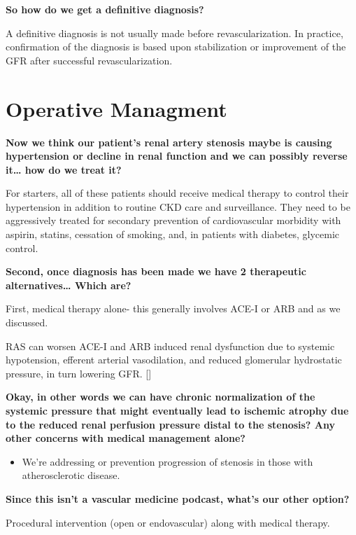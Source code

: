 \documentclass[
]{book}
\providecommand{\tightlist}{%
  \setlength{\itemsep}{0pt}\setlength{\parskip}{0pt}}
\begin{document}
\textbf{So how do we get a definitive diagnosis?}

A definitive diagnosis is not usually made before revascularization. In
practice, confirmation of the diagnosis is based upon stabilization or
improvement of the GFR after successful revascularization.

\hypertarget{operative-managment}{%
\section{Operative Managment}\label{operative-managment}}

\textbf{Now we think our patient's renal artery stenosis maybe is causing
hypertension or decline in renal function and we can possibly reverse
it\ldots{} how do we treat it?}

For starters, all of these patients should receive medical therapy to
control their hypertension in addition to routine CKD care and
surveillance. They need to be aggressively treated for secondary
prevention of cardiovascular morbidity with aspirin, statins, cessation
of smoking, and, in patients with diabetes, glycemic control.

\textbf{Second, once diagnosis has been made we have 2 therapeutic
alternatives\ldots{} Which are?}

First, medical therapy alone- this generally involves ACE-I or ARB and
as we discussed.

RAS can worsen ACE-I and ARB induced renal dysfunction due to systemic
hypotension, efferent arterial vasodilation, and reduced glomerular
hydrostatic pressure, in turn lowering GFR.
{[}\citep{rickey125RenovascularDisease2019, schoolwerthRenalConsiderationsAngiotensin2001}{]}

\textbf{Okay, in other words we can have chronic normalization of the systemic
pressure that might eventually lead to ischemic atrophy due to the
reduced renal perfusion pressure distal to the stenosis? Any other
concerns with medical management alone?}

\begin{itemize}
\tightlist
\item
  We're addressing or prevention progression of stenosis in those with
  atherosclerotic disease.
\end{itemize}

\textbf{Since this isn't a vascular medicine podcast, what's our other
option?}

Procedural intervention (open or endovascular) along with medical
therapy.
\end{document}

